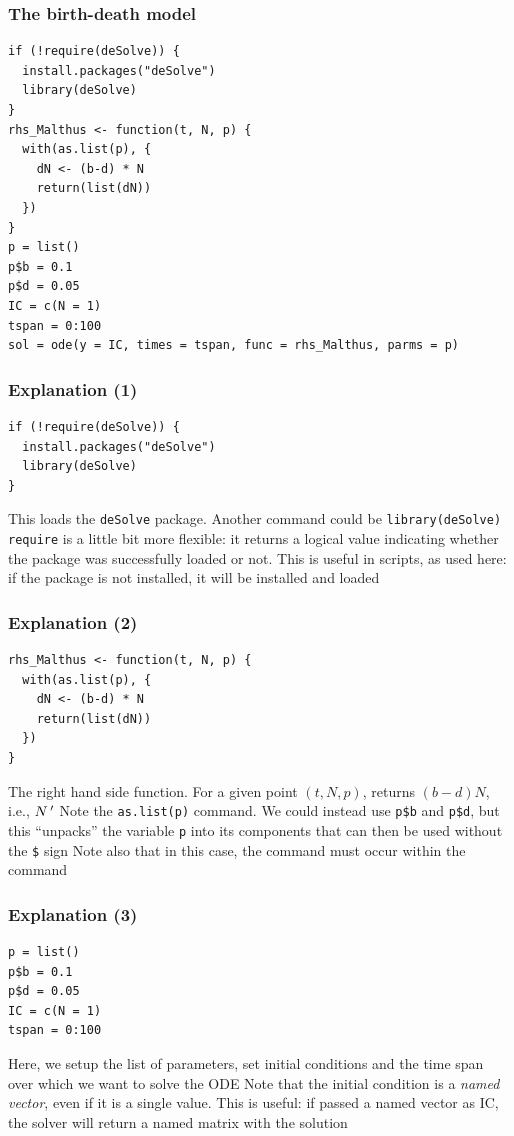 \documentclass[aspectratio=169]{beamer}
\begin{document}
\begin{frame}[fragile]\frametitle{The birth-death model}
\begin{lstlisting}
if (!require(deSolve)) {
  install.packages("deSolve")
  library(deSolve)
}
rhs_Malthus <- function(t, N, p) {
  with(as.list(p), {
    dN <- (b-d) * N
    return(list(dN))
  })
}
p = list()
p$b = 0.1
p$d = 0.05
IC = c(N = 1)
tspan = 0:100
sol = ode(y = IC, times = tspan, func = rhs_Malthus, parms = p)
\end{lstlisting}
\end{frame}

\begin{frame}[fragile]\frametitle{Explanation (1)}
\begin{lstlisting}
if (!require(deSolve)) {
  install.packages("deSolve")
  library(deSolve)
}
\end{lstlisting}
\vfill 
This loads the \texttt{deSolve} package. Another command could be \texttt{library(deSolve)}
\vfill
\texttt{require} is a little bit more flexible: it returns a logical value indicating whether the package was successfully loaded or not. This is useful in scripts, as used here: if the package is not installed, it will be installed and loaded
\end{frame}

\begin{frame}[fragile]\frametitle{Explanation (2)}
\begin{lstlisting}
rhs_Malthus <- function(t, N, p) {
  with(as.list(p), {
    dN <- (b-d) * N
    return(list(dN))
  })
}
\end{lstlisting}
\vfill
The right hand side function. For a given point $(t,N,p)$, returns $(b-d)N$, i.e., $N\,'$
\vfill
Note the \texttt{as.list(p)} command. We could instead use \texttt{p\$b} and \texttt{p\$d}, but this ``unpacks'' the variable \texttt{p} into its components that can then be used without the \texttt{\$} sign
\vfill
Note also that in this case, the  command must occur within the  command
\end{frame}

\begin{frame}[fragile]\frametitle{Explanation (3)}
\begin{lstlisting}
p = list()
p$b = 0.1
p$d = 0.05
IC = c(N = 1)
tspan = 0:100
\end{lstlisting}
\vfill
Here, we setup the list of parameters, set initial conditions and the time span over which we want to solve the ODE
\vfill
Note that the initial condition is a \emph{named vector}, even if it is a single value. This is useful: if passed a named vector as IC, the solver will return a named matrix with the solution
\end{frame}
\end{document}

